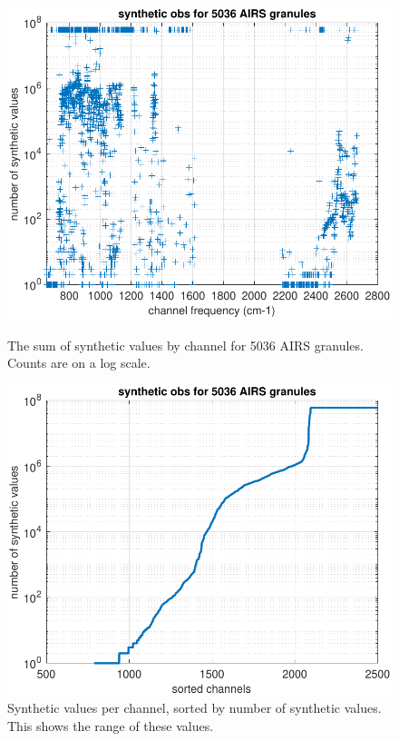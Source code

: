 \documentclass[11pt]{article}
\begin{document}

\begin{figure}
  \centering
  \begin{minipage}[t]{0.45\textwidth}
    \centering
    \includegraphics[width=\textwidth]{figures/synth_obs_freq_order.pdf}
    \caption{The sum of synthetic values by channel for 5036 AIRS
      granules.  Counts are on a log scale.}
    \label{fig8}
  \end{minipage}\hfill
  \begin{minipage}[t]{0.45\textwidth}
    \centering
    \includegraphics[width=\textwidth]{figures/synthetic_obs_counts.pdf}
    \caption{Synthetic values per channel, sorted by number of
      synthetic values.  This shows the range of these values.}
    \label{fig9}
  \end{minipage}
\end{figure}
\end{document}
